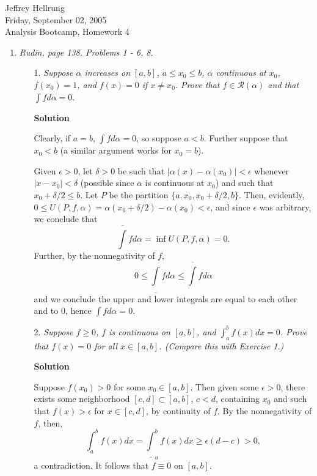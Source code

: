 \documentclass{article}
\begin{document}
\begin{flushright}
Jeffrey Hellrung \\
Friday, September 02, 2005 \\
Analysis Bootcamp, Homework 4 \\
\end{flushright}


\begin{enumerate}

\item {\em Rudin, page 138.  Problems 1 - 6, 8.}

\begin{itemize}

\item[1.] {\em Suppose \(\alpha\) increases on \([a,b]\), \(a \leq x_0 \leq b\), \(\alpha\) continuous at \(x_0\), \(f(x_0) = 1\), and \(f(x) = 0\) if \(x \neq x_0\).  Prove that \(f \in \mathcal{R}(\alpha)\) and that \(\int f d\alpha = 0\).}

{\bf Solution}

Clearly, if \(a = b\), \(\int f d\alpha = 0\), so suppose \(a < b\).  Further suppose that \(x_0 < b\) (a similar argument works for \(x_0 = b\)).

Given \(\epsilon > 0\), let \(\delta > 0\) be such that \(|\alpha(x) - \alpha(x_0)| < \epsilon\) whenever \(|x - x_0| < \delta\) (possible since \(\alpha\) is continuous at \(x_0\)) and such that \(x_0 + \delta/2 \leq b\).  Let \(P\) be the partition \(\{a, x_0, x_0 + \delta/2, b\}\).  Then, evidently, \(0 \leq U(P,f,\alpha) = \alpha(x_0 + \delta/2) - \alpha(x_0) < \epsilon\), and since \(\epsilon\) was arbitrary, we conclude that
\[\overline{\int} f d\alpha = \inf U(P,f,\alpha) = 0.\]
Further, by the nonnegativity of \(f\),
\[0 \leq \underline{\int} f d\alpha \leq \overline{\int} f d\alpha\]
and we conclude the upper and lower integrals are equal to each other and to \(0\), hence \(\int f d\alpha = 0\).



\item[2.] {\em Suppose \(f \geq 0\), \(f\) is continuous on \([a,b]\), and \(\int_a^b f(x) dx = 0\).  Prove that \(f(x) = 0\) for all \(x \in [a,b]\).  (Compare this with Exercise 1.)}

{\bf Solution}

Suppose \(f(x_0) > 0\) for some \(x_0 \in [a,b]\).  Then given some \(\epsilon > 0\), there exists some neighborhood \([c,d] \subset [a,b]\), \(c < d\), containing \(x_0\) and such that \(f(x) > \epsilon\) for \(x \in [c,d]\), by continuity of \(f\).  By the nonnegativity of \(f\), then,
\[\int_a^b f(x) dx = \underline{\int}_a^b f(x) dx \geq \epsilon (d - c) > 0,\]
a contradiction.  It follows that \(f \equiv 0\) on \([a,b]\).




\end{itemize}
\end{enumerate}
\end{document}

